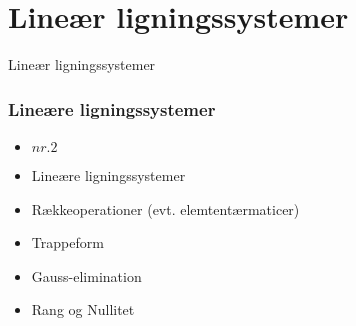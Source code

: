 \section{Lineær ligningssystemer}
\begin{frame}
\centering
\Huge
Lineær ligningssystemer
\end{frame}
%
\begin{frame}
\frametitle{Lineære ligningssystemer}
\begin{itemize}
\item \textbf{$nr. 2$}
\item Lineære ligningssystemer
\item Rækkeoperationer (evt. elemtentærmaticer)
\item Trappeform
\item Gauss-elimination
\item Rang og Nullitet
\end{itemize}
\end{frame}
